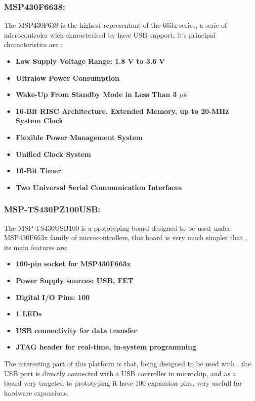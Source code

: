 		\subsubsection{MSP430F6638:}	
		\label{it:MSP430F6638}
		The MSP430F638 is the highest representant of the 663x series, a serie of microcontroler wich characterised by have USB support, it's principal characteristics are \cite{6638}:
		\begin{itemize}
			\item \textbf{Low Supply Voltage Range: 1.8 V to 3.6 V}
			\item \textbf{Ultralow Power Consumption}
			\item \textbf{Wake-Up From Standby Mode in Less Than 3 $\mu$s}
			\item \textbf{16-Bit RISC Architecture, Extended Memory, up to 20-MHz System Clock}
			\item \textbf{Flexible Power Management System}
			\item \textbf{Unified Clock System}
			\item \textbf{16-Bit Timer}
			\item \textbf{Two Universal Serial Communication Interfaces}\\
		\end{itemize}
		\subsubsection{MSP-TS430PZ100USB:}	
		\label{it:MSP-TS430PZ100USB}
		The MSP-TS430USB100 is a prototyping board designed to be used under MSP430F663x family of microcontrollers, this board is very much simpler that , its main features are\cite{6638board}:
		\begin{itemize}
			\item \textbf{100-pin socket for MSP430F663x}
			\item \textbf{Power Supply sources: USB, FET}
			\item \textbf{Digital I/O Pins: 100}
			\item \textbf{1 LEDs}
			\item \textbf{USB connectivity for data transfer}
			\item \textbf{JTAG header for real-time, in-system programming}
		\end{itemize}
		The interesting part of this platform is that, being designed to be used with , the USB port is directly connected with a USB controller in microchip, and as a board very targeted to prototyping it have 100 expansion pins, very usefull for hardware expansions. \\
